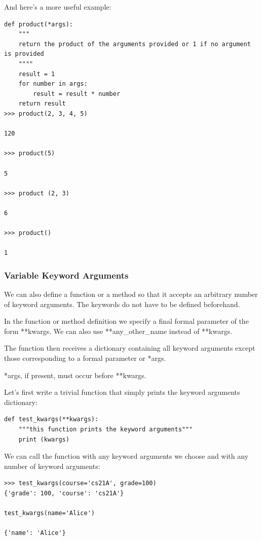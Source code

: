 \documentclass{article}
\begin{document}
And here's a more useful example:

\begin{lstlisting}
def product(*args):
    """
    return the product of the arguments provided or 1 if no argument is provided
    """"
    result = 1
    for number in args:
        result = result * number
    return result      
>>> product(2, 3, 4, 5)

120

>>> product(5)

5

>>> product (2, 3)

6

>>> product()

1
\end{lstlisting}

\subsubsection{Variable Keyword Arguments}

We can also define a function or a method so that it accepts an arbitrary number of keyword arguments.  The keywords do not have to be defined beforehand.

In the function or method definition we specify a final formal parameter of the form **kwargs. We can also use **any{\_}other{\_}name instead of **kwargs.

The function then receives a dictionary containing all keyword arguments except those corresponding to a formal parameter or *args.

*args, if present,  must occur before **kwargs.

Let's first write a trivial function that simply prints the keyword arguments dictionary:

\begin{lstlisting}
def test_kwargs(**kwargs):
    """this function prints the keyword arguments"""
    print (kwargs)
\end{lstlisting}
 
We can call the function with any keyword arguments we choose and with any number of keyword arguments:
 
\begin{lstlisting}
>>> test_kwargs(course='cs21A', grade=100)
{'grade': 100, 'course': 'cs21A'}

test_kwargs(name='Alice')

{'name': 'Alice'}
\end{lstlisting}
\end{document}
